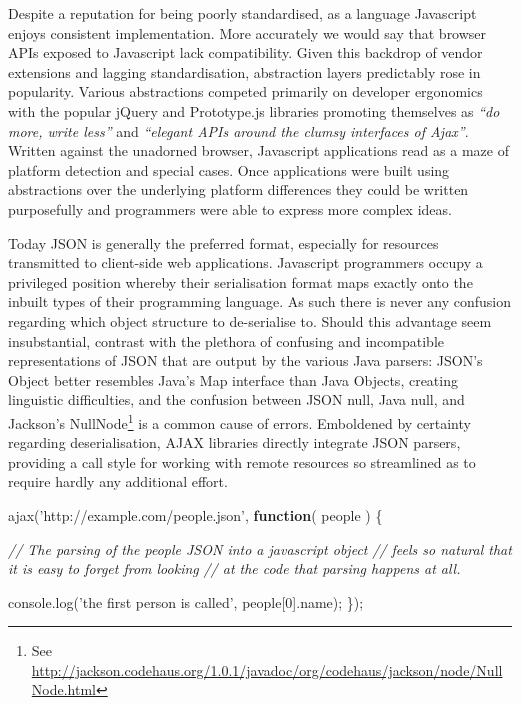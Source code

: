 \documentclass[12pt, ]{article}
\newenvironment{Shaded}{}{}
\newcommand{\KeywordTok}[1]{\textcolor[rgb]{0.00,0.44,0.13}{\textbf{{#1}}}}
\newcommand{\DecValTok}[1]{\textcolor[rgb]{0.25,0.63,0.44}{{#1}}}
\newcommand{\StringTok}[1]{\textcolor[rgb]{0.25,0.44,0.63}{{#1}}}
\newcommand{\CommentTok}[1]{\textcolor[rgb]{0.38,0.63,0.69}{\textit{{#1}}}}
\newcommand{\OtherTok}[1]{\textcolor[rgb]{0.00,0.44,0.13}{{#1}}}
\newcommand{\FunctionTok}[1]{\textcolor[rgb]{0.02,0.16,0.49}{{#1}}}
\newcommand{\NormalTok}[1]{{#1}}
\begin{document}
Despite a reputation for being poorly standardised, as a language
Javascript enjoys consistent implementation. More accurately we would
say that browser APIs exposed to Javascript lack compatibility. Given
this backdrop of vendor extensions and lagging standardisation,
abstraction layers predictably rose in popularity. Various abstractions
competed primarily on developer ergonomics with the popular jQuery and
Prototype.js libraries promoting themselves as \emph{``do more, write
less''} and \emph{``elegant APIs around the clumsy interfaces of
Ajax''}. Written against the unadorned browser, Javascript applications
read as a maze of platform detection and special cases. Once
applications were built using abstractions over the underlying platform
differences they could be written purposefully and programmers were able
to express more complex ideas.

Today JSON is generally the preferred format, especially for resources
transmitted to client-side web applications. Javascript programmers
occupy a privileged position whereby their serialisation format maps
exactly onto the inbuilt types of their programming language. As such
there is never any confusion regarding which object structure to
de-serialise to. Should this advantage seem insubstantial, contrast with
the plethora of confusing and incompatible representations of JSON that
are output by the various Java parsers: JSON's Object better resembles
Java's Map interface than Java Objects, creating linguistic
difficulties, and the confusion between JSON null, Java null, and
Jackson's NullNode\footnote{See
  \url{http://jackson.codehaus.org/1.0.1/javadoc/org/codehaus/jackson/node/NullNode.html}}
is a common cause of errors. Emboldened by certainty regarding
deserialisation, AJAX libraries directly integrate JSON parsers,
providing a call style for working with remote resources so streamlined
as to require hardly any additional effort.

\begin{Shaded}
\begin{Highlighting}[]
\FunctionTok{ajax}\NormalTok{(}\StringTok{'http://example.com/people.json'}\NormalTok{, }\KeywordTok{function}\NormalTok{( people ) \{}

   \CommentTok{// The parsing of the people JSON into a javascript object}
   \CommentTok{// feels so natural that it is easy to forget from looking }
   \CommentTok{// at the code that parsing happens at all. }
   
   \OtherTok{console}\NormalTok{.}\FunctionTok{log}\NormalTok{(}\StringTok{'the first person is called'}\NormalTok{, people[}\DecValTok{0}\NormalTok{].}\FunctionTok{name}\NormalTok{);}
\NormalTok{\});}
\end{Highlighting}
\end{Shaded}
\end{document}
